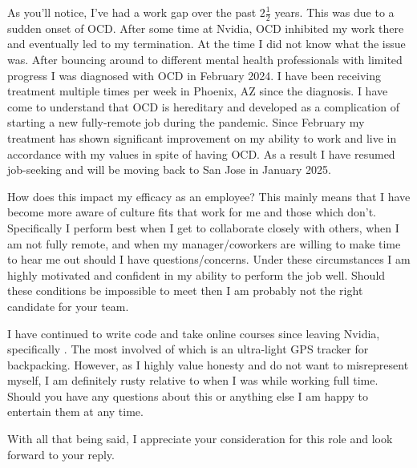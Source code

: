 \documentclass[11pt,a4paper,sans]{moderncv}        %
\begin{document}
As you'll notice, I've had a work gap over the past $2\frac{1}{2}$ years. This was due to a sudden onset of OCD. After some time at Nvidia, OCD inhibited my work there and eventually led to my termination. At the time I did not know what the issue was. After bouncing around to different mental health professionals with limited progress I was diagnosed with OCD in February 2024. I have been receiving treatment multiple times per week in Phoenix, AZ since the diagnosis. I have come to understand that OCD is hereditary and developed as a complication of starting a new fully-remote job during the pandemic. Since February my treatment has shown significant improvement on my ability to work and live in accordance with my values in spite of having OCD. As a result I have resumed job-seeking and will be moving back to San Jose in January 2025.

How does this impact my efficacy as an employee? This mainly means that I have become more aware of culture fits that work for me and those which don't. Specifically I perform best when I get to collaborate closely with others, when I am not fully remote, and when my manager/coworkers are willing to make time to hear me out should I have questions/concerns. Under these circumstances I am highly motivated and confident in my ability to perform the job well. Should these conditions be impossible to meet then I am probably not the right candidate for your team.

I have continued to write code and take online courses since leaving Nvidia, specifically . The most involved of which is an ultra-light GPS tracker for backpacking. However, as I highly value honesty and do not want to misrepresent myself, I am definitely rusty relative to when I was while working full time. Should you have any questions about this or anything else I am happy to entertain them at any time.

With all that being said, I appreciate your consideration for this role and look forward to your reply.

\makeletterclosing

\end{document}
